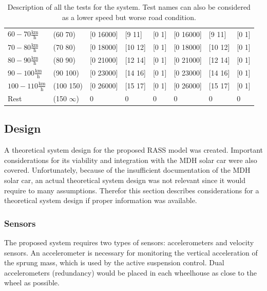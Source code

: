 \begin{table}[ht]
{\begin{tabular}{|l|l|l|l|l|l|l|l|}
            $60-70\frac{\text{km}}{\text{h}}$        & (60 70)           & [0 16000]     & [9 11]        & [0 1]          & [0 16000]        & [9 11]         & [0 1]            \\
            $70-80\frac{\text{km}}{\text{h}}$        & (70 80)           & [0 18000]     & [10 12]       & [0 1]          & [0 18000]        & [10 12]        & [0 1]            \\
            $80-90\frac{\text{km}}{\text{h}}$        & (80 90)           & [0 21000]     & [12 14]       & [0 1]          & [0 21000]        & [12 14]        & [0 1]            \\
            $90-100\frac{\text{km}}{\text{h}}$       & (90 100)          & [0 23000]     & [14 16]       & [0 1]          & [0 23000]        & [14 16]        & [0 1]            \\
            $100-110\frac{\text{km}}{\text{h}}$      & (100 150)         & [0 26000]     & [15 17]       & [0 1]          & [0 26000]        & [15 17]        & [0 1]            \\
            Rest                                     & (150 $\infty$)      & 0             & 0             & 0              & 0                & 0              & 0                \\
			\hline
		\end{tabular}}
	\caption{Description of all the tests for the system. Test names can also be considered as a lower speed but worse road condition.}
	\label{tab:tests}
\end{table}

\subsection{Design}
A theoretical system design for the proposed RASS model was created. Important considerations for its viability and integration with the MDH solar car were also covered. Unfortunately, because of the insufficient documentation of the MDH solar car, an actual theoretical system design was not relevant since it would require to many assumptions. Therefor this section describes considerations for a theoretical system design if proper information was available.
\subsubsection{Sensors}
The proposed system requires two types of sensors: accelerometers and velocity sensors.
An accelerometer is necessary for monitoring the vertical acceleration of the sprung mass, which is used by the active suspension control. Dual accelerometers (redundancy) would be placed in each wheelhouse as close to the wheel as possible.

